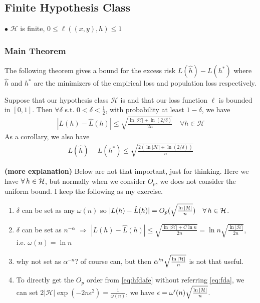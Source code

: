 \documentclass{article}
\newcommand{\bfs}[1]{\textbf{({#1}) }}
\begin{document}
\subsection{Finite Hypothesis Class}
$\bullet$   $\mathcal{H}$ is finite, $0 \leq \ell((x, y), h) \leq 1$
\subsubsection{Main Theorem}
The following theorem gives a bound for the excess risk $L(\hat{h})-L\left(h^{*}\right)$ where $\hat{h}$ and $h^{*}$ are the minimizers of the empirical loss and population loss respectively.

\begin{thma}\label{thm:finite_uniform}
Suppose that our hypothesis class $\mathcal{H}$ is  and that our loss function $\ell$ is bounded in $[0,1]$. Then $\forall \delta$ s.t. $0<\delta<\frac{1}{2}$, with probability at least $1-\delta$, we have
\begin{align}
|L(h)-\hat{L}(h)| \leq \sqrt{\frac{\ln |\mathcal{H}|+\ln (2 / \delta)}{2 n}} \quad \forall h \in \mathcal{H}\label{eq:fda}
\end{align}
As a corollary, we also have
\begin{align}
L(\hat{h})-L\left(h^{*}\right) \leq \sqrt{\frac{2(\ln |\mathcal{H}|+\ln (2 / \delta))}{n}}\label{eq:hjfda}
\end{align}
\end{thma}
\begin{rema}\bfs{more explanation}\label{rem:qiied} Below are not that important, just for thinking. Here we have $\forall h\in \calH$, but normally when we consider $O_p$, we does not consider the uniform bound. I keep the following as my exercise.
\begin{enumerate}
    \item $\delta$ can be set as any $\omega(n)$ so $|L(h)-\hat{L}(h)|=O_p(\sqrt{\frac{\ln |\calH|}{n}}) \quad \forall h\in \calH$. 
    \item $\delta$ can be set as $n^{-\alpha}$ $\Rightarrow$ $|L(h)-\hat{L}(h)|\le \sqrt{\frac{\ln |\mathcal{H}|+C\ln n}{2 n}}=\ln n\sqrt{\frac{\ln |\mathcal{H}|}{2 n}}$, i.e. $\omega(n)=\ln n$
    \item why not set as $\alpha^{-n}$? of course can, but then $\alpha'^n\sqrt{\frac{\ln |\mathcal{H}|}{n}}$ is not that useful.
    \item To directly get the $O_p$ order from \cref{eq:hfdafe} without referring \cref{eq:fda}, we can set $2|\mathcal{H}| \exp \left(-2 n \epsilon^{2}\right)=\frac{1}{\omega(n)}$, we have $\epsilon = \omega'(n)\sqrt{\frac{\ln |\mathcal{H}|}{n}}$.
\end{enumerate}
\end{rema}
\end{document}

